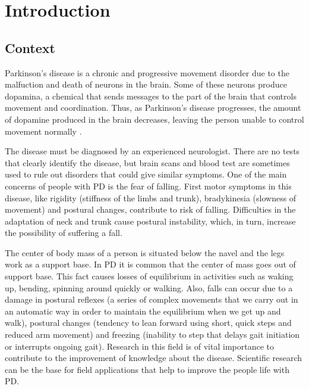 
\chapter{Introduction}
\label{ch:Introduccion}

\section{Context}
Parkinson’s disease is a chronic and progressive movement disorder due to the malfuction and death of neurons in the brain. Some of these neurons produce dopamina, a chemical that sends messages to the part of the brain that controls movement and coordination. Thus, as Parkinson’s disease progresses,  the amount of dopamine produced in the brain decreases, leaving the person unable to control movement normally \cite{pdf}.

The disease must be diagnosed by an experienced neurologist. There are no tests that clearly identify the disease, but brain scans and blood test are sometimes used to rule out disorders that could give similar symptoms. 
One of the main concerns of people with PD is the fear of falling. First motor symptoms in this disease, like rigidity (stiffness  of the limbs and trunk), bradykinesia (slowness of movement) and postural changes, contribute to  risk of falling. Difficulties in the adaptation of neck and trunk cause  postural instability, which, in turn, increase the possibility of suffering a fall.

The center of body mass of a person is situated below the navel and the legs work as a support base. In PD it is common that the center of  mass goes out of support base. This fact causes losses of equilibrium in activities such as waking up, bending, spinning  around quickly or walking. Also, falls can occur due to a damage in postural reflexes (a series of complex movements that we carry out in an automatic way in order to maintain the equilibrium when we get up and walk), postural changes (tendency to lean forward using short, quick steps and reduced arm movement) and freezing (inability to step that delays gait initiation or interrupts ongoing gait). Research in this field is of vital importance to contribute to the improvement of knowledge about the disease. Scientific research can be the base for  field applications that help to improve the people life with PD. \cite{ParkinsonDisease}\cite{pdf}

